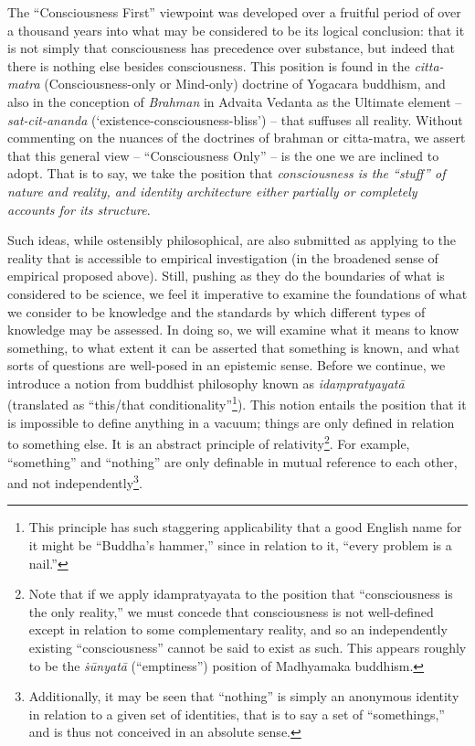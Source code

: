 \documentclass[pra,twocolumn,groupedaddress,10pt]{revtex4}
\theoremstyle{definition}
\begin{document}
The ``Consciousness First'' viewpoint was developed over a fruitful period of over a thousand years into what may be considered to be its logical conclusion: that it is not simply that consciousness has precedence over substance, but indeed that there is nothing else besides consciousness. This position is found in the \emph{citta-matra} (Consciousness-only or Mind-only) doctrine of Yogacara buddhism, and also in the conception of \emph{Brahman} in Advaita Vedanta as the Ultimate element -- \emph{sat-cit-ananda} (`existence-consciousness-bliss') -- that suffuses all reality\cite{waite}. Without commenting on the nuances of the doctrines of brahman or citta-matra, we assert that this general view -- ``Consciousness Only'' -- is the one we are inclined to adopt. That is to say, we take the position that \emph{consciousness is the ``stuff'' of nature and reality, and identity architecture either partially or completely accounts for its structure}.

Such ideas, while ostensibly philosophical, are also submitted as applying to the reality that is accessible to empirical investigation (in the broadened sense of empirical proposed above). Still, pushing as they do the boundaries of what is considered to be science, we feel it imperative to examine the foundations of what we consider to be knowledge and the standards by which different types of knowledge may be assessed. In doing so, we will examine what it means to know something, to what extent it can be asserted that something is known, and what sorts of questions are well-posed in an epistemic sense. Before we continue, we introduce a notion from buddhist philosophy known as \emph{ida\d{m}pratyayat\={a}} (translated as ``this/that conditionality''\footnote{This principle has such staggering applicability that a good English name for it might be ``Buddha's hammer,'' since in relation to it, ``every problem is a nail.''}). This notion entails the position that it is impossible to define anything in a vacuum; things are only defined in relation to something else. It is an abstract principle of relativity\footnote{Note that if we apply idampratyayata to the position that ``consciousness is the only reality,'' we must concede that consciousness is not well-defined except in relation to some complementary reality, and so an independently existing ``consciousness'' cannot be said to exist as such. This appears roughly to be the \emph{\.{s}\={u}nyat\={a}} (``emptiness'') position of Madhyamaka buddhism.}. For example, ``something'' and ``nothing'' are only definable in mutual reference to each other, and not independently\footnote{Additionally, it may be seen that ``nothing'' is simply an anonymous identity in relation to a given set of identities, that is to say a set of ``somethings,'' and is thus not conceived in an absolute sense.}.
\end{document}
